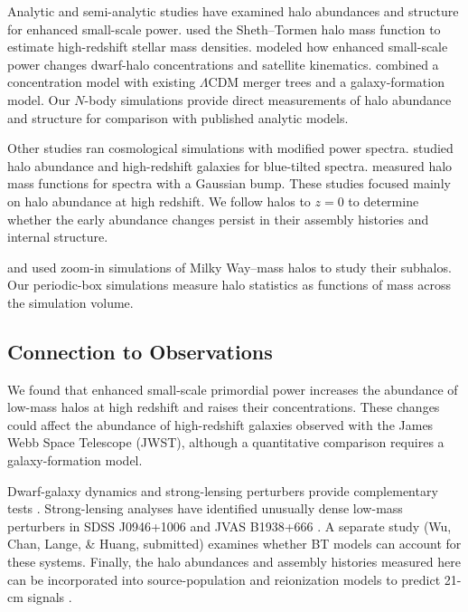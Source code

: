\documentclass[
 reprint,
 superscriptaddress,
 nofootinbib,
 nobibnotes,
 amsmath,
 amssymb,
 aps,
 prd,
 floatfix,
 longbibliography
]{revtex4-2}
\begin{document}
Analytic and semi-analytic studies have examined halo abundances and structure for enhanced small-scale power. \citet{Parashari23JWSTPPS} used the Sheth--Tormen halo mass function to estimate high-redshift stellar mass densities. \citet{Esteban2024lumpyDM} modeled how enhanced small-scale power changes dwarf-halo concentrations and satellite kinematics. \citet{Dekker25DwarfPPS} combined a concentration model with existing \(\Lambda\)CDM merger trees and a galaxy-formation model. Our \(N\)-body simulations provide direct measurements of halo abundance and structure for comparison with published analytic models.

Other studies ran cosmological simulations with modified power spectra. \citet{Hira24bluetilt} studied halo abundance and high-redshift galaxies for blue-tilted spectra. \citet{Tkac24BumpyPPS} measured halo mass functions for spectra with a Gaussian bump. These studies focused mainly on halo abundance at high redshift. We follow halos to \(z=0\) to determine whether the early abundance changes persist in their assembly histories and internal structure.

\citet{Wu25BT} and \citet{Nadler2025enhanced} used zoom-in simulations of Milky Way--mass halos to study their subhalos. Our periodic-box simulations measure halo statistics as functions of mass across the simulation volume.


\subsection{Connection to Observations}

We found that enhanced small-scale primordial power increases the abundance of low-mass halos at high redshift and raises their concentrations. These changes could affect the abundance of high-redshift galaxies observed with the James Webb Space Telescope (JWST), although a quantitative comparison requires a galaxy-formation model.

Dwarf-galaxy dynamics and strong-lensing perturbers provide complementary tests \citep{Dekker25DwarfPPS,Gilman22SubgalacticPPS}. Strong-lensing analyses have identified unusually dense low-mass perturbers in SDSS J0946+1006 and JVAS B1938+666 \citep{Minor2021HighConcentration,Tajalli2025DensePerturbers}. A separate study (Wu, Chan, Lange, \& Huang, submitted) examines whether BT models can account for these systems. Finally, the halo abundances and assembly histories measured here can be incorporated into source-population and reionization models to predict 21-cm signals \citep{Munoz20SmallScale21cm,deKruijf25DarkAges,Zhu26SKAPPS}.
\end{document}

